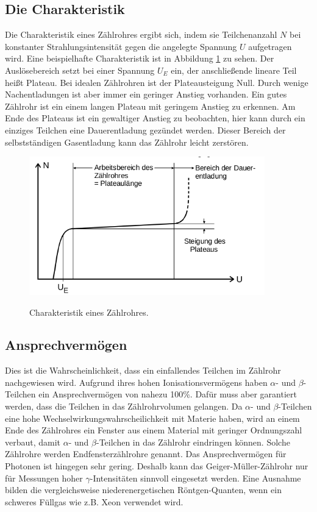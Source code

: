 \subsection{Die Charakteristik}
Die Charakteristik eines Zählrohres ergibt sich, indem sie Teilchenanzahl $N$ bei konstanter
Strahlungsintensität gegen die angelegte Spannung $U$ aufgetragen wird.
Eine beispielhafte Charakteristik ist in Abbildung \ref{fig:charak} zu sehen.
Der Auslösebereich setzt bei einer Spannung $U_E$ ein, der anschließende lineare Teil
heißt Plateau. Bei idealen Zählrohren ist der Plateausteigung Null.
Durch wenige Nachentladungen ist aber immer ein geringer Anstieg vorhanden.
Ein gutes Zählrohr ist ein einem langen Plateau mit geringem Anstieg zu erkennen.
Am Ende des Plateaus ist ein gewaltiger Anstieg zu beobachten, hier kann durch ein einziges
Teilchen eine Dauerentladung gezündet werden. Dieser Bereich der selbstständigen Gasentladung
kann das Zählrohr leicht zerstören.

\begin{figure}[H]
  \centering
  \includegraphics[height=6cm]{plateau.png}
  \caption{Charakteristik eines Zählrohres.}
  \label{fig:charak}
  \cite{skript}
\end{figure}

\subsection{Ansprechvermögen}
Dies ist die Wahrscheinlichkeit, dass ein einfallendes Teilchen im Zählrohr
nachgewiesen wird. Aufgrund ihres hohen Ionisationsvermögens haben
$\alpha$- und $\beta$-Teilchen ein Ansprechvermögen von nahezu 100\%.
Dafür muss aber garantiert werden, dass die Teilchen in das Zählrohrvolumen gelangen.
Da $\alpha$- und $\beta$-Teilchen eine hohe Wechselwirkungswahrscheilichkeit mit Materie
haben, wird an einem Ende des Zählrohres ein Fenster aus einem Material mit
geringer Ordnungszahl verbaut, damit $\alpha$- und $\beta$-Teilchen in das Zählrohr eindringen
können. Solche Zählrohre werden Endfensterzählrohre genannt.
Das Ansprechvermögen für Photonen ist hingegen sehr gering. Deshalb kann das
Geiger-Müller-Zählrohr nur für Messungen hoher $\gamma$-Intensitäten sinnvoll
eingesetzt werden. Eine Ausnahme bilden die vergleichsweise niederenergetischen
Röntgen-Quanten, wenn ein schweres Füllgas wie z.B. Xeon verwendet wird.

